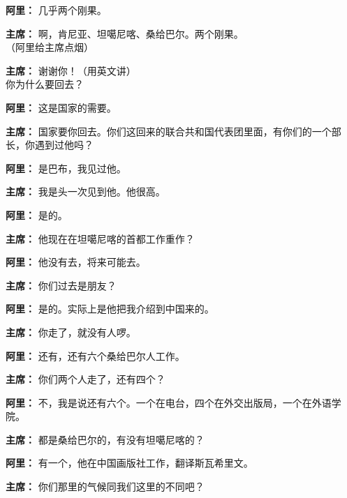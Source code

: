 \begin{duihua}
\item[\textbf{阿里：}] 几乎两个刚果。

\item[\textbf{主席：}] 啊，肯尼亚、坦噶尼喀、桑给巴尔。两个刚果。\\（阿里给主席点烟）

\item[\textbf{主席：}] 谢谢你！（用英文讲）\\你为什么要回去？

\item[\textbf{阿里：}] 这是国家的需要。

\item[\textbf{主席：}] 国家要你回去。你们这回来的联合共和国代表团里面，有你们的一个部长，你遇到过他吗？

\item[\textbf{阿里：}] 是巴布，我见过他。

\item[\textbf{主席：}] 我是头一次见到他。他很高。

\item[\textbf{阿里：}] 是的。

\item[\textbf{主席：}] 他现在在坦噶尼喀的首都工作重作？

\item[\textbf{阿里：}] 他没有去，将来可能去。

\item[\textbf{主席：}] 你们过去是朋友？

\item[\textbf{阿里：}] 是的。实际上是他把我介绍到中国来的。

\item[\textbf{主席：}] 你走了，就没有人啰。

\item[\textbf{阿里：}] 还有，还有六个桑给巴尔人工作。

\item[\textbf{主席：}] 你们两个人走了，还有四个？

\item[\textbf{阿里：}] 不，我是说还有六个。一个在电台，四个在外交出版局，一个在外语学院。

\item[\textbf{主席：}] 都是桑给巴尔的，有没有坦噶尼喀的？

\item[\textbf{阿里：}] 有一个，他在中国画版社工作，翻译斯瓦希里文。

\item[\textbf{主席：}] 你们那里的气候同我们这里的不同吧？


\end{duihua}
